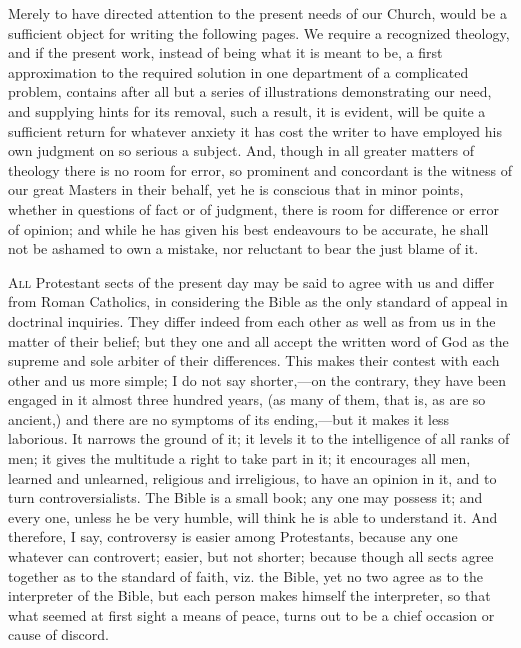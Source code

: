 Merely to have directed attention to the present needs of our
Church, would be a sufficient object for writing the following pages.
We require a recognized theology, and if the present work, instead of
being what it is meant to be, a first approximation to the required
solution in one department of a complicated problem, contains after
all but a series of illustrations demonstrating our need, and
supplying hints for its removal, such a result, it is evident, will be
quite a sufficient return for whatever anxiety it has cost the writer
to have employed his own judgment on so serious a subject. And, though
in all greater matters of theology there is no room for error, so
prominent and concordant is the witness of our great Masters in their
behalf, yet he is conscious that in minor points, whether in questions
of fact or of judgment, there is room for difference or error of
opinion; and while he has given his best endeavours to be accurate, he
shall not be ashamed to own a mistake, nor reluctant to bear the just
blame of it.


A\textsc{ll} Protestant sects of the present day may be said to agree
with us and differ from Roman Catholics, in considering the Bible as
the only standard of appeal in doctrinal inquiries. They differ indeed
from each other as well as from us in the matter of their belief; but
they one and all accept the written word of God as the supreme and
sole arbiter of their differences. This makes their contest with each
other and us more simple; I do not say shorter,—on the contrary,
they have been engaged in it almost three hundred years, (as many of
them, that is, as are so ancient,) and there are no symptoms of its
ending,—but it makes it less laborious. It narrows the ground of it;
it levels it to the intelligence of all ranks of men; it gives the
multitude a right to take part in it; it encourages all men, learned
and unlearned, religious and irreligious, to have an opinion in it,
and to turn controversialists. The Bible is a small book; any one may
possess it; and every one, unless he be very humble, will think he is
able to understand it. And therefore, I say, controversy is easier
among Protestants, because any one whatever can controvert; easier,
but not shorter; because though all sects agree together as to the
standard of faith, viz. the Bible, yet no two agree as to the
interpreter of the Bible, but each person makes himself the
interpreter, so that what seemed at first sight a means of peace,
turns out to be a chief occasion or cause of discord.

